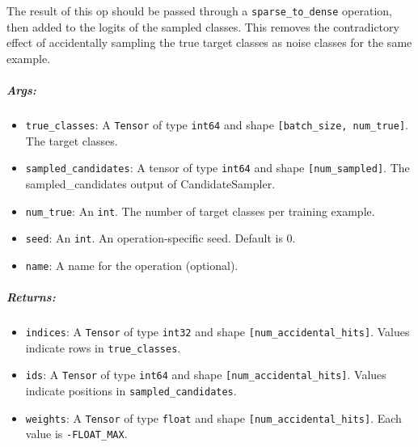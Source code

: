 The result of this op should be passed through a
\texttt{sparse\_to\_dense} operation, then added to the logits of the
sampled classes. This removes the contradictory effect of accidentally
sampling the true target classes as noise classes for the same example.

\subparagraph{Args: }\label{args-29}

\begin{itemize}
\tightlist
\item
  \texttt{true\_classes}: A \texttt{Tensor} of type \texttt{int64} and
  shape \texttt{{[}batch\_size,\ num\_true{]}}. The target classes.
\item
  \texttt{sampled\_candidates}: A tensor of type \texttt{int64} and
  shape \texttt{{[}num\_sampled{]}}. The sampled\_candidates output of
  CandidateSampler.
\item
  \texttt{num\_true}: An \texttt{int}. The number of target classes per
  training example.
\item
  \texttt{seed}: An \texttt{int}. An operation-specific seed. Default is
  0.
\item
  \texttt{name}: A name for the operation (optional).
\end{itemize}

\subparagraph{Returns: }\label{returns-29}

\begin{itemize}
\tightlist
\item
  \texttt{indices}: A \texttt{Tensor} of type \texttt{int32} and shape
  \texttt{{[}num\_accidental\_hits{]}}. Values indicate rows in
  \texttt{true\_classes}.
\item
  \texttt{ids}: A \texttt{Tensor} of type \texttt{int64} and shape
  \texttt{{[}num\_accidental\_hits{]}}. Values indicate positions in
  \texttt{sampled\_candidates}.
\item
  \texttt{weights}: A \texttt{Tensor} of type \texttt{float} and shape
  \texttt{{[}num\_accidental\_hits{]}}. Each value is
  \texttt{-FLOAT\_MAX}.
\end{itemize}


